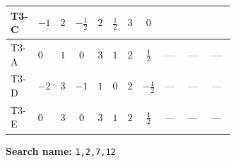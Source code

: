\documentclass[8pt]{article}
\begin{document}
\begin{landscape}
\begin{longtable}{@{}llcccccc >{\raggedright\arraybackslash}p{0.21\linewidth} >{\raggedright\arraybackslash}p{0.21\linewidth} >{\raggedright\arraybackslash}p{0.21\linewidth}@{}}
T3-C & $-1$ & $2$ & $-\frac{1}{2}$ & $2$ & $\frac{1}{2}$ & $3$ & $0$ & \scriptsize\adjustbox{max width=\linewidth}{$\begin{gathered} \frac{i lambda12Inv2 \overline{y_{1}} \overline{y_{2}}}{6 MF}\end{gathered}$} & \scriptsize\adjustbox{max width=\linewidth}{$\begin{gathered} \frac{\sqrt{3} i g_{2}^{2} \overline{y_{1}} \overline{y_{2}}}{8 MF}\end{gathered}$} & \scriptsize\adjustbox{max width=\linewidth}{$\begin{gathered} - \frac{\sqrt{3} i ye \overline{y_{1}} \overline{y_{2}} \overline{ye}}{24 MF}\end{gathered}$} \\
\midrule
T3-A & $0$ & $1$ & $0$ & $3$ & $1$ & $2$ & $\frac{1}{2}$ & --- & --- & --- \\
\midrule
T3-D & $-2$ & $3$ & $-1$ & $1$ & $0$ & $2$ & $-\frac{1}{2}$ & --- & --- & --- \\
\midrule
T3-E & $0$ & $3$ & $0$ & $3$ & $1$ & $2$ & $\frac{1}{2}$ & --- & --- & --- \\
\midrule
\bottomrule
\end{longtable}
\clearpage
\noindent\textbf{Search name: }\texttt{1,2,7,12}\par\smallskip

\end{landscape}
\end{document}
